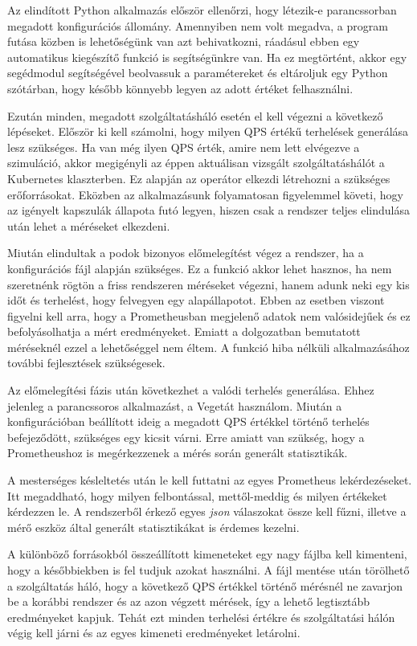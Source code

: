 Az elindított Python alkalmazás először ellenőrzi, hogy létezik-e parancssorban megadott konfigurációs állomány.
Amennyiben nem volt megadva, a program futása közben is lehetőségünk van azt behivatkozni, ráadásul ebben egy automatikus kiegészítő funkció is segítségünkre van.
Ha ez megtörtént, akkor egy segédmodul segítségével beolvassuk a paramétereket és eltároljuk egy Python szótárban, hogy később könnyebb legyen az adott értéket felhasználni.

Ezután minden, megadott szolgáltatásháló esetén el kell végezni a következő lépéseket.
Először ki kell számolni, hogy milyen QPS értékű terhelések generálása lesz szükséges.
Ha van még ilyen QPS érték, amire nem lett elvégezve a szimuláció, akkor megigényli az éppen aktuálisan vizsgált szolgáltatáshálót a Kubernetes klaszterben.
Ez alapján az operátor elkezdi létrehozni a szükséges erőforrásokat. 
Eközben az alkalmazásunk folyamatosan figyelemmel követi, hogy az igényelt kapszulák állapota futó legyen, hiszen csak a rendszer teljes elindulása után lehet a méréseket elkezdeni.

Miután elindultak a podok bizonyos előmelegítést végez a rendszer, ha a konfigurációs fájl alapján szükséges.
Ez a funkció akkor lehet hasznos, ha nem szeretnénk rögtön a friss rendszeren méréseket végezni, hanem adunk neki egy kis időt és terhelést, hogy felvegyen egy alapállapotot.
Ebben az esetben viszont figyelni kell arra, hogy a Prometheusban megjelenő adatok nem valósidejűek és ez befolyásolhatja a mért eredményeket.
Emiatt a dolgozatban bemutatott méréseknél ezzel a lehetőséggel nem éltem.
A funkció hiba nélküli alkalmazásához további fejlesztések szükségesek.

Az előmelegítési fázis után következhet a valódi terhelés generálása.
Ehhez jelenleg a parancssoros alkalmazást, a Vegetát használom.
Miután a konfigurációban beállított ideig a megadott QPS értékkel történő terhelés befejeződött, szükséges egy kicsit várni.
Erre amiatt van szükség, hogy a Prometheushoz is megérkezzenek a mérés során generált statisztikák.

A mesterséges késleltetés után le kell futtatni az egyes Prometheus lekérdezéseket.
Itt megaddható, hogy milyen felbontással, mettől-meddig és milyen értékeket kérdezzen le.
A rendszerből érkező egyes \textit{json} válaszokat össze kell fűzni, illetve a mérő eszköz által generált statisztikákat is érdemes kezelni.

A különböző forrásokból összeállított kimeneteket egy nagy fájlba kell kimenteni, hogy a későbbiekben is fel tudjuk azokat használni.
A fájl mentése után törölhető a szolgáltatás háló, hogy a következő QPS értékkel történő mérésnél ne zavarjon be a korábbi rendszer és az azon végzett  mérések, így a lehető legtisztább eredményeket kapjuk.
Tehát ezt minden terhelési értékre és szolgáltatási hálón végig kell járni és az egyes kimeneti eredményeket letárolni.

